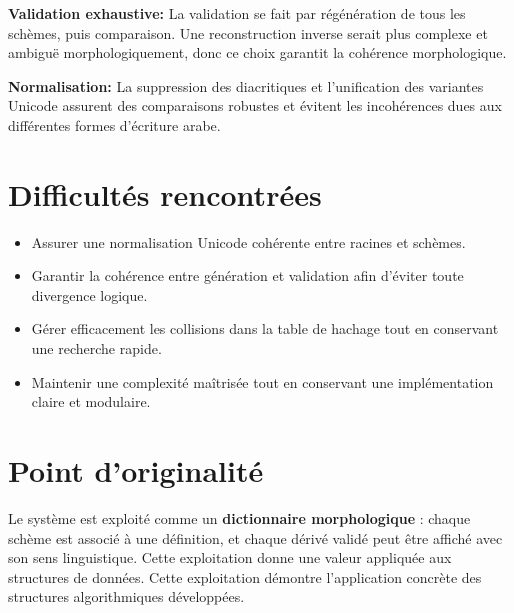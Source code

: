 \documentclass[11pt,a4paper]{article}
\begin{document}
\textbf{Validation exhaustive:}  
La validation se fait par régénération de tous les schèmes, puis comparaison.
Une reconstruction inverse serait plus complexe et ambiguë morphologiquement, donc ce choix garantit la cohérence morphologique.

\textbf{Normalisation:}  
La suppression des diacritiques et l’unification des variantes Unicode assurent des comparaisons robustes et évitent les incohérences dues aux différentes formes d’écriture arabe.

\section{Difficultés rencontrées}

\begin{itemize}[nosep]
\item Assurer une normalisation Unicode cohérente entre racines et schèmes.
\item Garantir la cohérence entre génération et validation afin d’éviter toute divergence logique.
\item Gérer efficacement les collisions dans la table de hachage tout en conservant une recherche rapide.
\item Maintenir une complexité maîtrisée tout en conservant une implémentation claire et modulaire.
\end{itemize}

\section{Point d’originalité}

Le système est exploité comme un \textbf{dictionnaire morphologique} : chaque schème est associé à une définition, et chaque dérivé validé peut être affiché avec son sens linguistique. Cette exploitation donne une valeur appliquée aux structures de données.
Cette exploitation démontre l’application concrète des structures algorithmiques développées.
\end{document}
